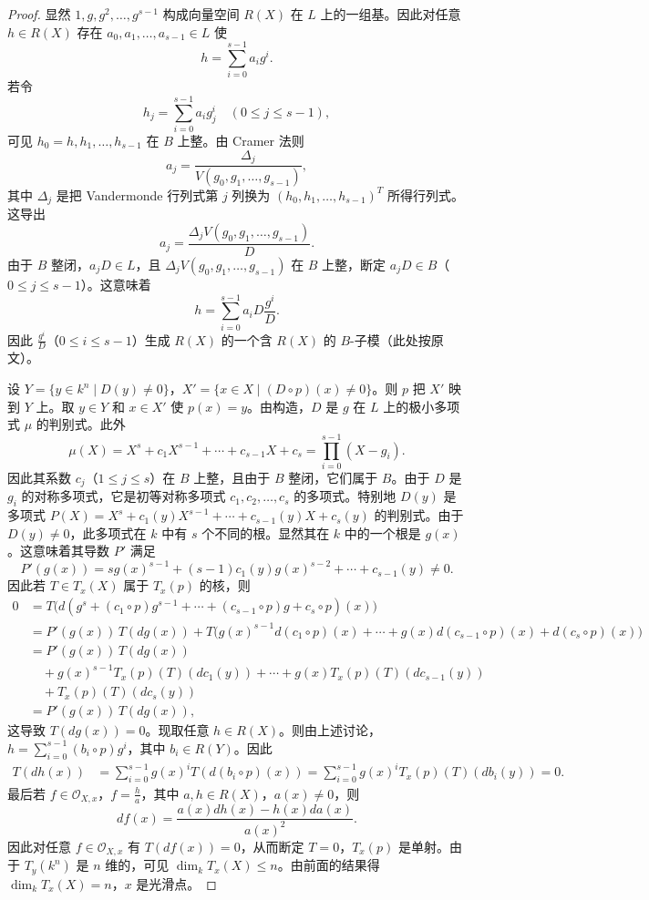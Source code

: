 \begin{proof}
显然 $1,g,g^2,\dots,g^{s-1}$ 构成向量空间 $R(X)$ 在 $L$ 上的一组基。因此对任意 $h\in R(X)$ 存在 $a_0,a_1,\dots,a_{s-1}\in L$ 使
$$h=\sum_{i=0}^{s-1}a_i g^i.$$
若令
$$h_j=\sum_{i=0}^{s-1}a_i g_j^i\quad(0\le j\le s-1),$$
可见 $h_0=h,h_1,\dots,h_{s-1}$ 在 $B$ 上整。由 Cramer 法则
$$a_j=\frac{\Delta_j}{V(g_0,g_1,\dots,g_{s-1})},$$
其中 $\Delta_j$ 是把 Vandermonde 行列式第 $j$ 列换为 $(h_0,h_1,\dots,h_{s-1})^T$ 所得行列式。这导出
$$a_j=\frac{\Delta_jV(g_0,g_1,\dots,g_{s-1})}{D}.$$
由于 $B$ 整闭，$a_jD\in L$，且 $\Delta_jV(g_0,g_1,\dots,g_{s-1})$ 在 $B$ 上整，断定 $a_jD\in B$（$0\le j\le s-1$）。这意味着
$$h=\sum_{i=0}^{s-1}a_iD\frac{g^i}{D}.$$
因此 $\frac{g^i}{D}$（$0\le i\le s-1$）生成 $R(X)$ 的一个含 $R(X)$ 的 $B$-子模（此处按原文）。

设 $Y=\{y\in k^n\mid D(y)\neq 0\}$，$X'=\{x\in X\mid (D\circ p)(x)\neq 0\}$。则 $p$ 把 $X'$ 映到 $Y$ 上。取 $y\in Y$ 和 $x\in X'$ 使 $p(x)=y$。由构造，$D$ 是 $g$ 在 $L$ 上的极小多项式 $\mu$ 的判别式。此外
$$\mu(X)=X^s+c_1X^{s-1}+\cdots+c_{s-1}X+c_s=\prod_{i=0}^{s-1}(X-g_i).$$
因此其系数 $c_j$（$1\le j\le s$）在 $B$ 上整，且由于 $B$ 整闭，它们属于 $B$。由于 $D$ 是 $g_i$ 的对称多项式，它是初等对称多项式 $c_1,c_2,\dots,c_s$ 的多项式。特别地 $D(y)$ 是多项式 $P(X)=X^s+c_1(y)X^{s-1}+\cdots+c_{s-1}(y)X+c_s(y)$ 的判别式。由于 $D(y)\neq 0$，此多项式在 $k$ 中有 $s$ 个不同的根。显然其在 $k$ 中的一个根是 $g(x)$。这意味着其导数 $P'$ 满足
$$P'(g(x))=sg(x)^{s-1}+(s-1)c_1(y)g(x)^{s-2}+\cdots+c_{s-1}(y)\neq 0.$$
因此若 $T\in T_x(X)$ 属于 $T_x(p)$ 的核，则
\begin{align*}
0&=T\bigl(d(g^s+(c_1\circ p)g^{s-1}+\cdots+(c_{s-1}\circ p)g+c_s\circ p)(x)\bigr)\\
&=P'(g(x))\,T(dg(x))+T\bigl(g(x)^{s-1}d(c_1\circ p)(x)+\cdots+g(x)d(c_{s-1}\circ p)(x)+d(c_s\circ p)(x)\bigr)\\
&=P'(g(x))\,T(dg(x))\\
&\quad +g(x)^{s-1}T_x(p)(T)(dc_1(y))+\cdots+g(x)T_x(p)(T)(dc_{s-1}(y))\\
&\quad +T_x(p)(T)(dc_s(y))\\
&=P'(g(x))\,T(dg(x)),
\end{align*}
这导致 $T(dg(x))=0$。现取任意 $h\in R(X)$。则由上述讨论，$h=\sum_{i=0}^{s-1}(b_i\circ p)g^i$，其中 $b_i\in R(Y)$。因此
\begin{align*}
T(dh(x))&=\sum_{i=0}^{s-1}g(x)^iT(d(b_i\circ p)(x))
=\sum_{i=0}^{s-1}g(x)^iT_x(p)(T)(db_i(y))=0.
\end{align*}
最后若 $f\in\mathcal{O}_{X,x}$，$f=\frac{h}{a}$，其中 $a,h\in R(X)$，$a(x)\neq 0$，则
$$df(x)=\frac{a(x)dh(x)-h(x)da(x)}{a(x)^2}.$$
因此对任意 $f\in\mathcal{O}_{X,x}$ 有 $T(df(x))=0$，从而断定 $T=0$，$T_x(p)$ 是单射。由于 $T_y(k^n)$ 是 $n$ 维的，可见 $\dim_kT_x(X)\le n$。由前面的结果得 $\dim_kT_x(X)=n$，$x$ 是光滑点。
\end{proof}

